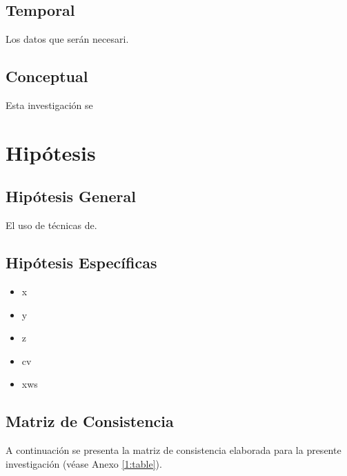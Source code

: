 \subsection{Temporal}
Los datos que serán necesari. 

\subsection{Conceptual}
Esta investigación se 

\section{Hipótesis}

\subsection{Hipótesis General}
\newcommand{\HipotesisGeneral}{
	El uso de técnicas de.
}
\HipotesisGeneral
\subsection{Hipótesis Específicas}
\newcommand{\Hone}{
	x
}
\newcommand{\Htwo}{
	y
}
\newcommand{\Hthree}{
	z	
}
\newcommand{\Hfour}{
	cv
}
\newcommand{\Hfive}{
	xws
}
\begin{itemize}
	\item \Hone
	\item \Htwo
	\item \Hthree
	\item \Hfour
	\item \Hfive
\end{itemize}

\subsection{Matriz de Consistencia}
A continuación se presenta la matriz de consistencia elaborada para la presente investigación (véase Anexo \ref{1:table}).
